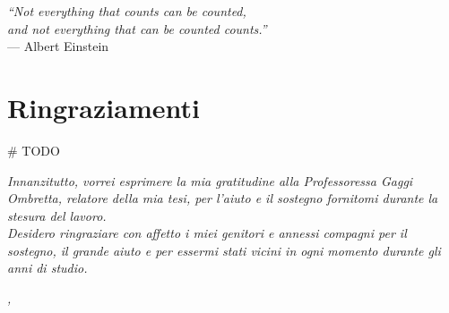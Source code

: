 
\cleardoublepage
{}
{}

\begin{flushright}{
	\slshape    
	``Not everything that counts can be counted, \\and not everything that can be counted counts.''} \\ 
	\medskip
    --- Albert Einstein
\end{flushright}


\bigskip

\begingroup
\let\clearpage\relax
\let\cleardoublepage\relax

\chapter*{Ringraziamenti}

\# TODO

\noindent \textit{Innanzitutto, vorrei esprimere la mia gratitudine alla Professoressa Gaggi Ombretta, relatore della mia tesi, per l'aiuto e il sostegno fornitomi durante la stesura del lavoro.}\\

\noindent \textit{Desidero ringraziare con affetto i miei genitori e annessi compagni per il sostegno, il grande aiuto e per essermi stati vicini in ogni momento durante gli anni di studio.}\\

\bigskip

\noindent\textit{\myLocation, \myTime}
\hfill \myName

\endgroup

